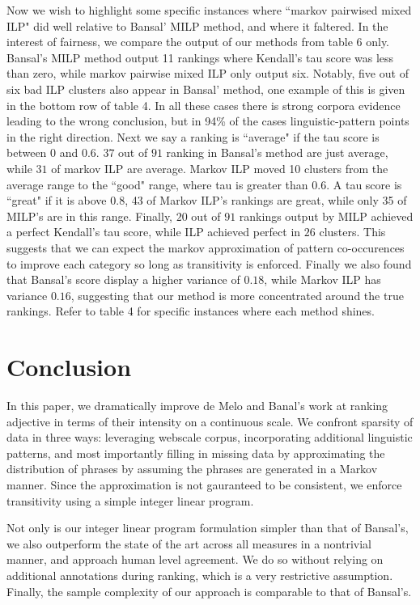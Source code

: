 \documentclass[11pt,letterpaper]{article}
\begin{document}
Now we wish to highlight some specific instances where ``markov pairwised mixed ILP" did well relative to Bansal' MILP method, and where it faltered. In the interest of fairness, we compare the output of our methods from table 6 only. Bansal's MILP method output 11 rankings where Kendall's tau score was less than zero, while  markov pairwise mixed ILP only output six. Notably, five out of six bad ILP clusters also appear in Bansal' method, one example of this is given in the bottom row of table 4. In all these cases there is strong corpora evidence leading to the wrong conclusion, but in 94\% of the cases linguistic-pattern points in the right direction. Next we say a ranking is ``average" if the tau score is between $0$ and $0.6$. $37$ out of $91$ ranking in Bansal's method are just average, while $31$ of markov ILP are average. Markov ILP moved 10 clusters from the average range to the ``good" range, where tau is greater than $0.6$. A tau score is ``great" if it is above $0.8$, 43 of Markov ILP's rankings are great, while only 35 of MILP's are in this range. Finally, $20$ out of $91$ rankings output by MILP achieved a perfect Kendall's tau score, while ILP achieved perfect in $26$ clusters. This suggests that we can expect the markov approximation of pattern co-occurences to improve each category so long as transitivity is enforced. Finally we also found that Bansal's score display a higher variance of $0.18$, while Markov ILP has variance $0.16$, suggesting that our method is more concentrated around the true rankings. Refer to table 4 for specific instances where each method shines. 





\section{Conclusion}

In this paper, we dramatically improve de Melo and Banal's work at ranking adjective in terms of their intensity on a continuous scale. We confront sparsity of data in three ways: leveraging webscale corpus, incorporating additional linguistic patterns, and most importantly filling in missing data by approximating the distribution of phrases by assuming the phrases are generated in a Markov manner. Since the approximation is not gauranteed to be consistent, we enforce transitivity using a simple integer linear program. 

Not only is our integer linear program formulation simpler than that of Bansal's, we also outperform the state of the art across all measures in a nontrivial manner, and approach human level agreement. We do so without relying on additional annotations during ranking, which is a very restrictive assumption. Finally, the sample complexity of our approach is comparable to that of Bansal's. 
\end{document}
